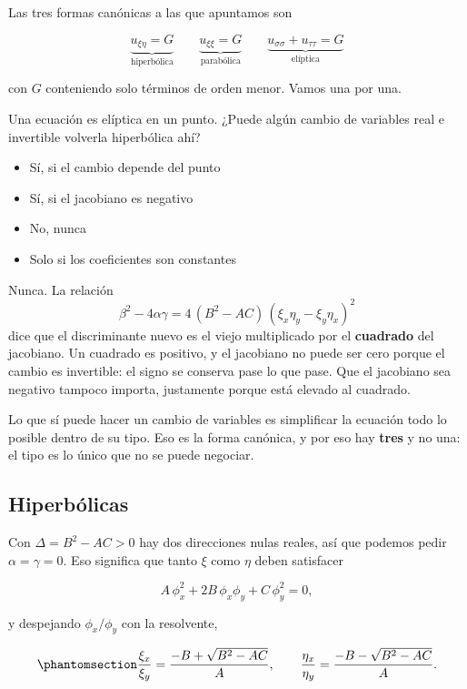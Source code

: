 \documentclass[
  spanish,
  a4paper,
]{scrbook}
\providecommand{\tightlist}{%
  \setlength{\itemsep}{0pt}\setlength{\parskip}{0pt}}
\theoremstyle{definition}
\theoremstyle{plain}
\theoremstyle{definition}
\theoremstyle{plain}
\theoremstyle{definition}
\theoremstyle{remark}
\begin{document}
Las tres formas canónicas a las que apuntamos son

\[
\underbrace{u_{\xi\eta} = G}_{\text{hiperbólica}} \qquad
\underbrace{u_{\xi\xi} = G}_{\text{parabólica}} \qquad
\underbrace{u_{\sigma\sigma} + u_{\tau\tau} = G}_{\text{elíptica}}
\]

con \(G\) conteniendo solo términos de orden menor. Vamos una por una.

Una ecuación es elíptica en un punto. ¿Puede algún cambio de variables
real e invertible volverla hiperbólica ahí?

\begin{itemize}
\tightlist
\item
  {Sí, si el cambio depende del punto}
\item
  {Sí, si el jacobiano es negativo}
\item
  {No, nunca}
\item
  {Solo si los coeficientes son constantes}
\end{itemize}

Nunca. La relación
\[\beta^2 - 4\alpha\gamma = 4\,(B^2-AC)\,(\xi_x\eta_y - \xi_y\eta_x)^2\]
dice que el discriminante nuevo es el viejo multiplicado por el
\textbf{cuadrado} del jacobiano. Un cuadrado es positivo, y el jacobiano
no puede ser cero porque el cambio es invertible: el signo se conserva
pase lo que pase. Que el jacobiano sea negativo tampoco importa,
justamente porque está elevado al cuadrado.

Lo que sí puede hacer un cambio de variables es simplificar la ecuación
todo lo posible dentro de su tipo. Eso es la forma canónica, y por eso
hay \textbf{tres} y no una: el tipo es lo único que no se puede
negociar.

\subsection{Hiperbólicas}\label{sec-canonica-hiperbolica}

Con \(\Delta = B^2-AC > 0\) hay dos direcciones nulas reales, así que
podemos pedir \(\alpha = \gamma = 0\). Eso significa que tanto \(\xi\)
como \(\eta\) deben satisfacer

\[
A\,\phi_x^2 + 2B\,\phi_x\phi_y + C\,\phi_y^2 = 0 ,
\]

y despejando \(\phi_x/\phi_y\) con la resolvente,

\begin{equation}\protect\phantomsection\label{eq-dos-nulas}{
\frac{\xi_x}{\xi_y} = \frac{-B+\sqrt{B^2-AC}}{A}, \qquad
\frac{\eta_x}{\eta_y} = \frac{-B-\sqrt{B^2-AC}}{A} .
}\end{equation}
\end{document}
